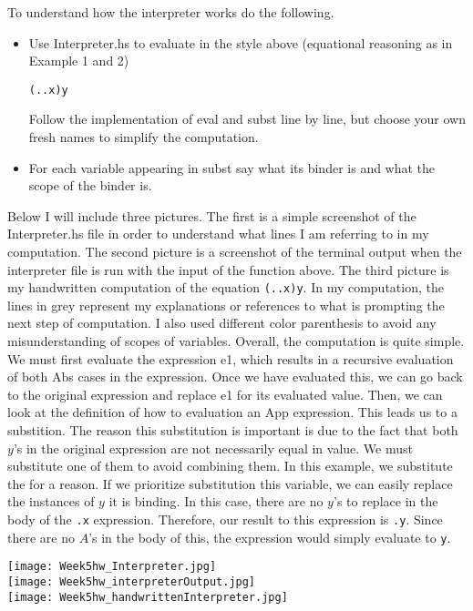 \documentclass{article}
\theoremstyle{theorem}
\theoremstyle{definition}
\theoremstyle{remark}
\begin{document}
To understand how the interpreter works do the following.
\begin{itemize}
  \item Use Interpreter.hs to evaluate in the style above (equational reasoning as in Example 1 and 2) \begin{center}\texttt{(\x.\y.x)y}\end{center}Follow the implementation of eval and subst line by line, but choose your own fresh names to simplify the computation.
  \item For each variable appearing in subst say what its binder is and what the scope of the binder is.
\end{itemize}
Below I will include three pictures. The first is a simple screenshot of the Interpreter.hs file in order to understand what lines I am referring to in my computation. The second picture is a screenshot of the terminal output when the interpreter file is run with the input of the function above. 
The third picture is my handwritten computation of the equation \texttt{(\x.\y.x)y}. 
In my computation, the lines in grey represent my explanations or references to what is prompting the next step of computation. I also used different color parenthesis to avoid any misunderstanding of scopes of variables. Overall, the computation is quite simple. 
We must first evaluate the expression e1, which results in a recursive evaluation of both Abs cases in the expression. Once we have evaluated this, we can go back to the original expression and replace e1 for its evaluated value. Then, we can look at the definition of 
how to evaluation an App expression. This leads us to a substition. The reason this substitution is important is due to the fact that both $y$'s in the original expression are not necessarily equal in value. We must substitute one of them to avoid combining them. In this example, 
we substitute the \texttt{\y} for a reason. If we prioritize substitution this variable, we can easily replace the instances of $y$ it is binding. In this case, there are no $y$'s to replace in the body of the \texttt{\y.x} expression. Therefore, our 
result to this expression is \texttt{\A.y}. Since there are no $A$'s in the body of this, the expression would simply evaluate to \texttt{y}.

\texttt{[image: Week5hw\_Interpreter.jpg]}\\
\texttt{[image: Week5hw\_interpreterOutput.jpg]}\\
\texttt{[image: Week5hw\_handwrittenInterpreter.jpg]}
\end{document}
